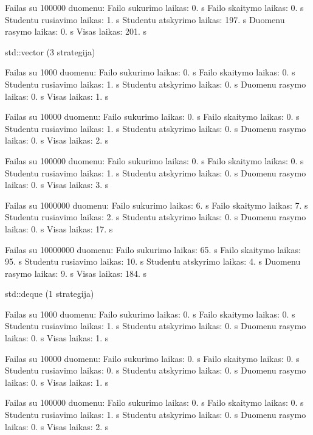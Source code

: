 Failas su 100000 duomenu\+: Failo sukurimo laikas\+: 0. s Failo skaitymo laikas\+: 0. s Studentu rusiavimo laikas\+: 1. s Studentu atskyrimo laikas\+: 197. s Duomenu rasymo laikas\+: 0. s Visas laikas\+: 201. s

std\+::vector (3 strategija)

Failas su 1000 duomenu\+: Failo sukurimo laikas\+: 0. s Failo skaitymo laikas\+: 0. s Studentu rusiavimo laikas\+: 1. s Studentu atskyrimo laikas\+: 0. s Duomenu rasymo laikas\+: 0. s Visas laikas\+: 1. s

Failas su 10000 duomenu\+: Failo sukurimo laikas\+: 0. s Failo skaitymo laikas\+: 0. s Studentu rusiavimo laikas\+: 1. s Studentu atskyrimo laikas\+: 0. s Duomenu rasymo laikas\+: 0. s Visas laikas\+: 2. s

Failas su 100000 duomenu\+: Failo sukurimo laikas\+: 0. s Failo skaitymo laikas\+: 0. s Studentu rusiavimo laikas\+: 1. s Studentu atskyrimo laikas\+: 0. s Duomenu rasymo laikas\+: 0. s Visas laikas\+: 3. s

Failas su 1000000 duomenu\+: Failo sukurimo laikas\+: 6. s Failo skaitymo laikas\+: 7. s Studentu rusiavimo laikas\+: 2. s Studentu atskyrimo laikas\+: 0. s Duomenu rasymo laikas\+: 0. s Visas laikas\+: 17. s

Failas su 10000000 duomenu\+: Failo sukurimo laikas\+: 65. s Failo skaitymo laikas\+: 95. s Studentu rusiavimo laikas\+: 10. s Studentu atskyrimo laikas\+: 4. s Duomenu rasymo laikas\+: 9. s Visas laikas\+: 184. s

std\+::deque (1 strategija)

Failas su 1000 duomenu\+: Failo sukurimo laikas\+: 0. s Failo skaitymo laikas\+: 0. s Studentu rusiavimo laikas\+: 1. s Studentu atskyrimo laikas\+: 0. s Duomenu rasymo laikas\+: 0. s Visas laikas\+: 1. s

Failas su 10000 duomenu\+: Failo sukurimo laikas\+: 0. s Failo skaitymo laikas\+: 0. s Studentu rusiavimo laikas\+: 0. s Studentu atskyrimo laikas\+: 0. s Duomenu rasymo laikas\+: 0. s Visas laikas\+: 1. s

Failas su 100000 duomenu\+: Failo sukurimo laikas\+: 0. s Failo skaitymo laikas\+: 0. s Studentu rusiavimo laikas\+: 1. s Studentu atskyrimo laikas\+: 0. s Duomenu rasymo laikas\+: 0. s Visas laikas\+: 2. s

